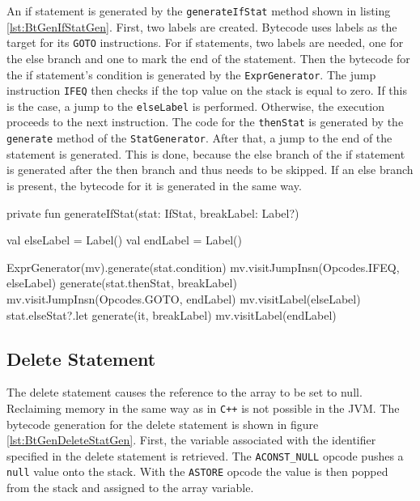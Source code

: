 An if statement is generated by the \verb|generateIfStat| method shown in listing \ref{lst:BtGenIfStatGen}. First, two labels are created. Bytecode uses labels as the target for its \verb|GOTO| instructions. For if statements, two labels are needed, one for the else branch and one to mark the end of the statement. Then the bytecode for the if statement's condition is generated by the \verb|ExprGenerator|. The jump instruction \verb|IFEQ| then checks if the top value on the stack is equal to zero. If this is the case, a jump to the \verb|elseLabel| is performed. Otherwise, the execution proceeds to the next instruction. The code for the \verb|thenStat| is generated by the \verb|generate| method of the \verb|StatGenerator|. After that, a jump to the end of the statement is generated. This is done, because the else branch of the if statement is generated after the then branch and thus needs to be skipped. If an else branch is present, the bytecode for it is generated in the same way.



\begin{KotlinCode}[float,numbers=none,caption=Implementation of the \texttt{generateIfStat} method of the \texttt{StatGenerator}., label=lst:BtGenIfStatGen]
private fun generateIfStat(stat: IfStat, breakLabel: Label?) {
    val elseLabel = Label()
    val endLabel = Label()

    ExprGenerator(mv).generate(stat.condition)
    mv.visitJumpInsn(Opcodes.IFEQ, elseLabel)
    generate(stat.thenStat, breakLabel)
    mv.visitJumpInsn(Opcodes.GOTO, endLabel)
    mv.visitLabel(elseLabel)
    stat.elseStat?.let { generate(it, breakLabel) }
    mv.visitLabel(endLabel)
}
\end{KotlinCode}

\subsection{Delete Statement}

The delete statement causes the reference to the array to be set to null. Reclaiming memory in the same way as in \verb|C++| is not possible in the JVM. The bytecode generation for the delete statement is shown in figure \ref{lst:BtGenDeleteStatGen}. First, the variable associated with the identifier specified in the delete statement is retrieved. The \verb|ACONST_NULL| opcode pushes a \verb|null| value onto the stack. With the \verb|ASTORE| opcode the value is then popped from the stack and assigned to the array variable. 


